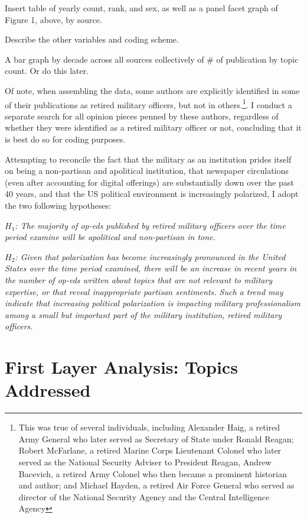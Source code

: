 \documentclass[12pt,]{article}
\begin{document}
Insert table of yearly count, rank, and sex, as well as a panel facet graph of Figure 1, above, by source.

Describe the other variables and coding scheme.

A bar graph by decade across all sources collectively of \# of publication by topic count. Or do this later.

Of note, when assembling the data, some authors are explicitly identified in some of their publications as retired military officers, but not in others.\footnote{This was true of several individuals, including Alexander Haig, a retired Army General who later served as Secretary of State under Ronald Reagan; Robert McFarlane, a retired Marine Corps Lieutenant Colonel who later served as the National Security Adviser to President Reagan, Andrew Bacevich, a retired Army Colonel who then became a prominent historian and author; and Michael Hayden, a retired Air Force General who served as director of the National Security Agency and the Central Intelligence Agency}. I conduct a separate search for all opinion pieces penned by these authors, regardless of whether they were identified as a retired military officer or not, concluding that it is best do so for coding purposes.

Attempting to reconcile the fact that the military as an institution prides itself on being a non-partisan and apolitical institution, that newspaper circulations (even after accounting for digital offerings) are substantially down over the past 40 years, and that the US political environment is increasingly polarized, I adopt the two following hypotheses:

\emph{\(H_1\): The majority of op-eds published by retired military officers over the time period examine will be apolitical and non-partisan in tone.}

\emph{\(H_2\): Given that polarization has become increasingly pronounced in the United States over the time period examined, there will be an increase in recent years in the number of op-eds written about topics that are not relevant to military expertise, or that reveal inappropriate partisan sentiments. Such a trend may indicate that increasing political polarization is impacting military professionalism among a small but important part of the military institution, retired military officers.}

\hypertarget{first-layer-analysis-topics-addressed}{%
\section{First Layer Analysis: Topics Addressed}\label{first-layer-analysis-topics-addressed}}
\end{document}
